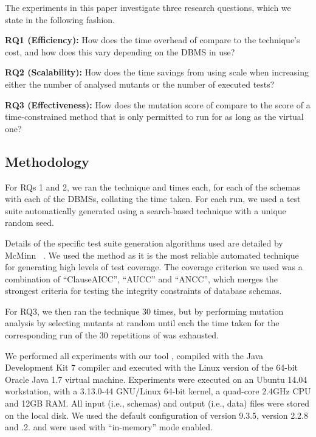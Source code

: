 The experiments in this paper investigate three research questions, which we state in the following fashion.

\vspace{5pt}

\noindent
\textbf{RQ1 (Efficiency):} How does the time overhead of \VMA compare to the \Standard technique's cost, and how does
this vary depending on the DBMS in use?

\vspace{5pt}

\noindent
\textbf{RQ2 (Scalability):} How does the time savings from using \VMA scale when increasing either the number
of analysed mutants or the number of executed tests?

\vspace{5pt}


\noindent
\textbf{RQ3 (Effectiveness):} How does the mutation score of \VMA compare to the score of a time-constrained method that
is only permitted to run for as long as the virtual one?

\subsection{Methodology}
\label{sec:methodology}
For RQs 1 and 2, we ran the \Original technique and  times each, for each of the schemas with each of the DBMSs, collating the time taken. For each run, we used a test suite automatically generated using a search-based technique with a unique random seed.

Details of the specific test suite generation algorithms used are detailed by McMinn \etal~\cite{McMinn2015}. We used the \AVM method as it is the most reliable automated technique for generating high levels of test coverage. The coverage criterion we used was a combination of ``ClauseAICC'', ``AUCC'' and ``ANCC'', which merges the strongest criteria for testing the integrity constraints of database schemas.

For RQ3, we then ran the \Original technique 30 times, but by performing mutation analysis by selecting mutants at random until each the time taken for the corresponding run of the 30 repetitions of \vma was exhausted.

We performed all experiments with our \SA tool \cite{Kapfhammer2013,Wright2014,McMinn2015},
compiled with the Java Development Kit 7 compiler and executed with the Linux version of the 64-bit Oracle Java 1.7 virtual machine. Experiments were executed on an Ubuntu 14.04 workstation, with a 3.13.0-44 GNU/Linux 64-bit kernel, a quad-core 2.4GHz CPU and 12GB RAM. All input (i.e., schemas) and output (i.e., data) files were stored on the local disk. We used the default configuration of \PostgreSQL version 9.3.5, \HyperSQL version 2.2.8 and .2. \HyperSQL and \SQLite were used with ``in-memory'' mode enabled.

